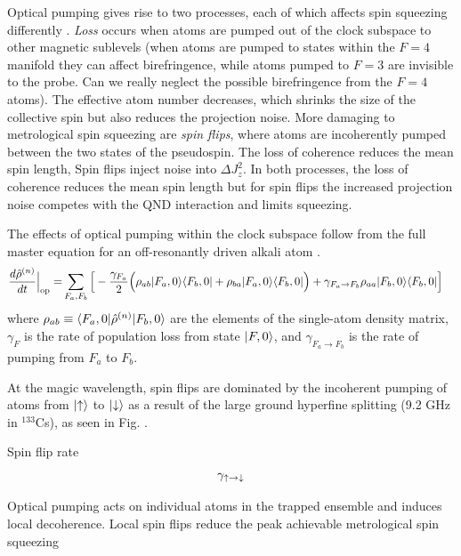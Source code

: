 \documentclass[preprint,aps,pra,onecolumn]{revtex4-1} %
\newcommand{\comment}[1]{{\color{Maroon} #1}}
\begin{document}
Optical pumping gives rise to two processes, each of which affects spin squeezing differently \cite{madsen_spin_2004,norris_enhanced_2012}. \emph{Loss} occurs when atoms are pumped out of the clock subspace to other magnetic sublevels \comment{(when atoms are pumped to states within the $F=4$ manifold they can affect birefringence, while atoms pumped to $F=3$ are invisible to the probe. Can we really neglect the possible birefringence from the $F=4$ atoms)}. The effective atom number decreases, which shrinks the size of the collective spin but also reduces the projection noise.  More damaging to metrological spin squeezing are \emph{spin flips}, where atoms are incoherently pumped between the two states of the pseudospin. The loss of coherence reduces the mean spin length, Spin flips inject noise into $\Delta J_z^2$.  In both processes, the loss of coherence reduces the mean spin length but for spin flips the increased projection noise competes with the QND interaction and limits squeezing.

The effects of optical pumping within the clock subspace follow from the full master equation for an off-resonantly driven alkali atom \cite{deutsch_quantum_2010}.  
	\begin{align}
		\frac{d \hat{\rho}^{(n)}  }{dt}\Big|_{\rm op} 
		= & \sum_{F_a,F_b} \Big[ -\frac{\gamma_{F_a}}{2} \Big( \rho_{ab } \lvert{F_a,0}\rangle\langle{F_b,0}\rvert + \rho_{ba} \lvert{F_a,0}\rangle\langle{F_b,0}\rvert \Big) +  \gamma_{F_a \rightarrow F_b} \rho_{aa} \lvert{F_b,0}\rangle\langle{F_b,0}\rvert \Big]
	\end{align}
where $\rho_{ab} \equiv \langle{F_a,0}\rvert \hat{\rho}^{(n)} \lvert{F_b,0}\rangle $ are the elements of the single-atom density matrix, $\gamma_F$ is the rate of population loss from state $\lvert{F,0}\rangle$, and $\gamma_{F_a \rightarrow F_b}$ is the rate of pumping from $F_a$ to $F_b$.  

At the magic wavelength, spin flips are dominated by the incoherent pumping of atoms from $\lvert{\uparrow}\rangle$ to $\lvert{\downarrow}\rangle$ as a result of the large ground hyperfine splitting (9.2 GHz in $^{133}$Cs), as seen in Fig. \frf{}. 

Spin flip rate
	\begin{align}
		\gamma_{\rm \uparrow \rightarrow \downarrow}
	\end{align}

Optical pumping acts on individual atoms in the trapped ensemble and induces local decoherence. Local spin flips reduce the peak achievable metrological spin squeezing 
\end{document}
